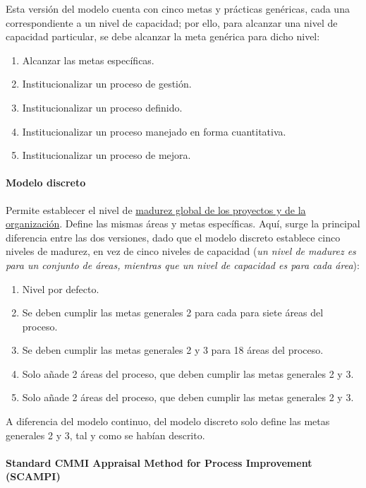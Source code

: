 Esta versión del modelo cuenta con cinco metas y prácticas genéricas, cada una correspondiente a un nivel de capacidad; por ello, para alcanzar una nivel de capacidad particular, se debe alcanzar la meta genérica para dicho nivel:

\begin{enumerate}
    \item Alcanzar las metas específicas.
    \item Institucionalizar un proceso de gestión.
    \item Institucionalizar un proceso definido.
    \item Institucionalizar un proceso manejado en forma cuantitativa.
    \item Institucionalizar un proceso de mejora.
\end{enumerate}

\paragraph{Modelo discreto} Permite establecer el nivel de \uline{madurez global de los proyectos y de la organización}. Define las mismas áreas y metas específicas. Aquí, surge la principal diferencia entre las dos versiones, dado que el modelo discreto establece cinco niveles de madurez, en vez de cinco niveles de capacidad (\textit{un nivel de madurez es para un conjunto de áreas, mientras que un nivel de capacidad es para cada área}):

\begin{enumerate}
    \item Nivel por defecto.
    \item Se deben cumplir las metas generales 2 para cada para siete áreas del proceso.
    \item Se deben cumplir las metas generales 2 y 3 para 18 áreas del proceso.
    \item Solo añade 2 áreas del proceso, que deben cumplir las metas generales 2 y 3.
    \item Solo añade 2 áreas del proceso, que deben cumplir las metas generales 2 y 3.
\end{enumerate}

A diferencia del modelo continuo, del modelo discreto solo define las metas generales 2 y 3, tal y como se habían descrito.

\paragraph{Standard CMMI Appraisal Method for Process Improvement (SCAMPI)}

